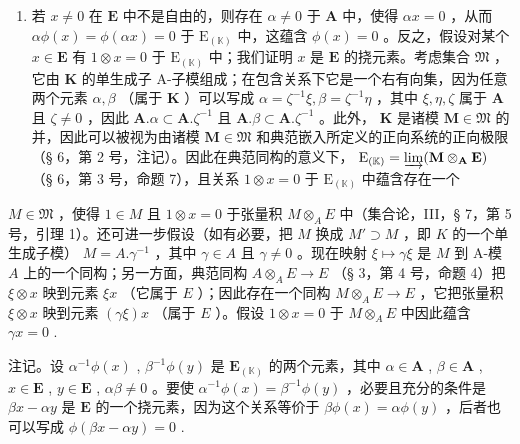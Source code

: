 \begin{enumerate}
\def\labelenumi{(\roman{enumi})}
\setcounter{enumi}{1}
\tightlist
\item
  若 \(x \neq 0\) 在 \(\mathbf{E}\) 中不是自由的，则存在 \(\alpha \neq 0\) 于 \(\mathbf{A}\) 中，使得 \(\alpha x = 0\) ，从而 \(\alpha \phi(x) = \phi(\alpha x) = 0\) 于 \(\mathrm{E}_{(\mathbb{K})}\) 中，这蕴含 \(\phi(x) = 0\) 。反之，假设对某个 \(x \in \mathbf{E}\) 有 \(1 \otimes x = 0\) 于 \(\mathrm{E}_{(\mathbb{K})}\) 中；我们证明 \(x\) 是 \(\mathbf{E}\) 的挠元素。考虑集合 \(\mathfrak{M}\) ，它由 \(\mathbf{K}\) 的单生成子 A-子模组成；在包含关系下它是一个右有向集，因为任意两个元素 \(\alpha, \beta\) （属于 \(\mathbf{K}\) ）可以写成 \(\alpha = \zeta^{-1}\xi, \beta = \zeta^{-1}\eta\) ，其中 \(\xi, \eta, \zeta\) 属于 \(\mathbf{A}\) 且 \(\zeta \neq 0\) ，因此 \(\mathbf{A}. \alpha \subset \mathbf{A}. \zeta^{-1}\) 且 \(\mathbf{A}. \beta \subset \mathbf{A}. \zeta^{-1}\) 。此外， \(\mathbf{K}\) 是诸模 \(\mathbf{M} \in \mathfrak{M}\) 的并，因此可以被视为由诸模 \(\mathbf{M} \in \mathfrak{M}\) 和典范嵌入所定义的正向系统的正向极限（§ 6，第 2 号，注记）。因此在典范同构的意义下， \(\mathrm{E}_{(\mathbb{K})} = \varinjlim (\mathbf{M} \otimes_{\mathbf{A}} \mathbf{E})\) （§ 6，第 3 号，命题 7），且关系 \(1 \otimes x = 0\) 于 \(\mathrm{E}_{(\mathbb{K})}\) 中蕴含存在一个
\end{enumerate}

\(M \in \mathfrak{M}\) ，使得 \(1 \in M\) 且 \(1 \otimes x = 0\) 于张量积 \(M \otimes_{A} E\) 中（集合论，III，§ 7，第 5 号，引理 1）。还可进一步假设（如有必要，把 \(M\) 换成 \(M' \supset M\) ，即 \(K\) 的一个单生成子模） \(M = A. \gamma^{-1}\) ，其中 \(\gamma \in A\) 且 \(\gamma \neq 0\) 。现在映射 \(\xi \mapsto \gamma\xi\) 是 \(M\) 到 A-模 \(A\) 上的一个同构；另一方面，典范同构 \(A \otimes_{A} E \to E\) （§ 3，第 4 号，命题 4）把 \(\xi \otimes x\) 映到元素 \(\xi x\) （它属于 \(E\) ）；因此存在一个同构 \(M \otimes_{A} E \to E\) ，它把张量积 \(\xi \otimes x\) 映到元素 \((\gamma\xi)x\) （属于 \(E\) ）。假设 \(1 \otimes x = 0\) 于 \(M \otimes_{A} E\) 中因此蕴含 \(\gamma x = 0\) .

注记。设 \(\alpha^{-1}\phi(x)\) , \(\beta^{-1}\phi(y)\) 是 \(\mathbf{E}_{(\mathbb{K})}\) 的两个元素，其中 \(\alpha\in\mathbf{A}\) , \(\beta\in\mathbf{A}\) , \(x\in\mathbf{E}\) , \(y\in\mathbf{E}\) , \(\alpha\beta\neq0\) 。要使 \(\alpha^{-1}\phi(x)=\beta^{-1}\phi(y)\) ，必要且充分的条件是 \(\beta x-\alpha y\) 是 \(\mathbf{E}\) 的一个挠元素，因为这个关系等价于 \(\beta\phi(x)=\alpha\phi(y)\) ，后者也可以写成 \(\phi(\beta x-\alpha y)=0\) .

